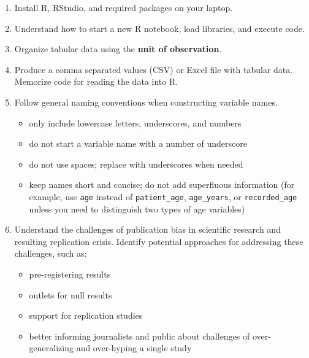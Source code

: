 \documentclass[11pt]{article}
\begin{document}
\begin{enumerate}
\item Install R, RStudio, and required packages on your laptop.

\item Understand how to start a new R notebook, load libraries, and execute
code.

\item Organize tabular data using the \textbf{unit of observation}.

\item Produce a comma separated values (CSV) or Excel file with tabular data.
Memorize code for reading
the data into R.

\item Follow general naming conventions when constructing variable names.
\begin{itemize}
\renewcommand{\labelitemi}{{\textcolor{dark}{{\tiny $\blacksquare$}}}}
\item only include lowercase letters, underscores, and numbers
\item do not start a variable name with a number of underscore
\item do not use spaces; replace with underscores when needed
\item keep names short and concise; do not add superfluous information
(for example, use \texttt{age} instead of \texttt{patient\_age},
\texttt{age\_years}, or \texttt{recorded\_age} unless you need to distinguish
two types of age variables)
\end{itemize}

\item Understand the challenges of publication bias in scientific research and
resulting replication crisis. Identify potential approaches for addressing
these challenges, such as:
\begin{itemize}
\renewcommand{\labelitemi}{{\textcolor{dark}{{\tiny $\blacksquare$}}}}
\item pre-registering results
\item outlets for null results
\item support for replication studies
\item better informing journalists and public about challenges of
over-generalizing and over-hyping a single study
\end{itemize}

\end{enumerate}
\end{document}
